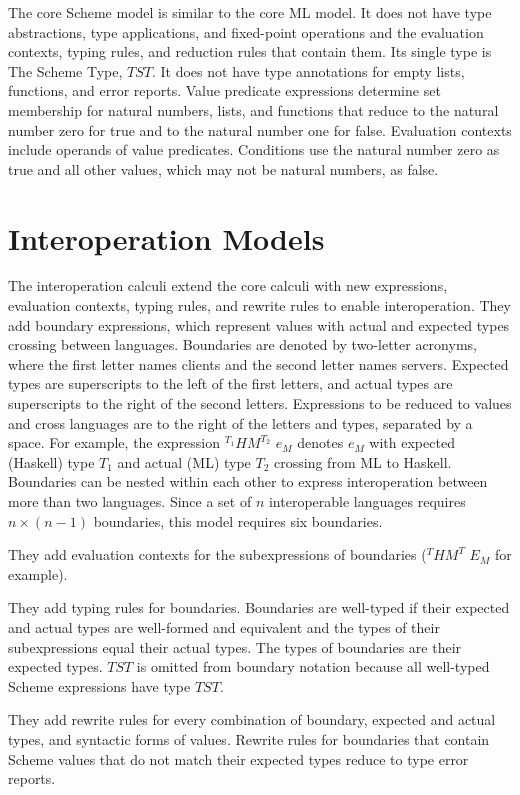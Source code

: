 The core Scheme model is similar to the core ML model.  It does not have type abstractions, type applications, and fixed-point operations and the evaluation contexts, typing rules, and reduction rules that contain them.  Its single type is The Scheme Type, $TST$.  It does not have type annotations for empty lists, functions, and error reports.  Value predicate expressions determine set membership for natural numbers, lists, and functions that reduce to the natural number zero for true and to the natural number one for false.  Evaluation contexts include operands of value predicates.  Conditions use the natural number zero as true and all other values, which may not be natural numbers, as false.

\section{Interoperation Models}

The interoperation calculi extend the core calculi with new expressions, evaluation contexts, typing rules, and rewrite rules to enable interoperation.  They add boundary expressions, which represent values with actual and expected types crossing between languages.  Boundaries are denoted by two-letter acronyms, where the first letter names clients and the second letter names servers.  Expected types are superscripts to the left of the first letters, and actual types are superscripts to the right of the second letters.  Expressions to be reduced to values and cross languages are to the right of the letters and types, separated by a space.  For example, the expression $^{T_{1}}HM^{T_{2}}$ $e_{M}$ denotes $e_{M}$ with expected (Haskell) type $T_{1}$ and actual (ML) type $T_{2}$ crossing from ML to Haskell.  Boundaries can be nested within each other to express interoperation between more than two languages.  Since a set of $n$ interoperable languages requires $n\times(n-1)$ boundaries, this model requires six boundaries.

They add evaluation contexts for the subexpressions of boundaries ($^{T}HM^{T}$ $E_{M}$ for example).

They add typing rules for boundaries.  Boundaries are well-typed if their expected and actual types are well-formed and equivalent and the types of their subexpressions equal their actual types.  The types of boundaries are their expected types.  $TST$ is omitted from boundary notation because all well-typed Scheme expressions have type $TST$.

They add rewrite rules for every combination of boundary, expected and actual types, and syntactic forms of values.  Rewrite rules for boundaries that contain Scheme values that do not match their expected types reduce to type error reports.

